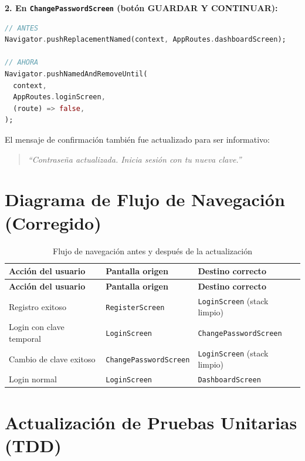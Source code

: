 \documentclass[12pt,a4paper]{article}
\begin{document}
\textbf{2. En \texttt{ChangePasswordScreen} (botón GUARDAR Y CONTINUAR):}
\begin{lstlisting}[language=Dart, caption={Redirección a login tras cambio exitoso}]
// ANTES
Navigator.pushReplacementNamed(context, AppRoutes.dashboardScreen);

// AHORA
Navigator.pushNamedAndRemoveUntil(
  context,
  AppRoutes.loginScreen,
  (route) => false,
);
\end{lstlisting}

El mensaje de confirmación también fue actualizado para ser informativo:
\begin{quote}
\textit{``Contraseña actualizada. Inicia sesión con tu nueva clave.''}
\end{quote}

\section{Diagrama de Flujo de Navegación (Corregido)}

\begin{longtable}{p{5cm} p{5cm} p{3.5cm}}
\caption{Flujo de navegación antes y después de la actualización} \label{tab:flujo-nav} \\
\toprule
\textbf{Acción del usuario} & \textbf{Pantalla origen} & \textbf{Destino correcto} \\
\midrule
\endfirsthead
\toprule
\textbf{Acción del usuario} & \textbf{Pantalla origen} & \textbf{Destino correcto} \\
\midrule
\endhead
\bottomrule
\endlastfoot
Registro exitoso & \texttt{RegisterScreen} & \texttt{LoginScreen} (stack limpio) \\
Login con clave temporal & \texttt{LoginScreen} & \texttt{ChangePasswordScreen} \\
Cambio de clave exitoso & \texttt{ChangePasswordScreen} & \texttt{LoginScreen} (stack limpio) \\
Login normal & \texttt{LoginScreen} & \texttt{DashboardScreen} \\
\end{longtable}

\section{Actualización de Pruebas Unitarias (TDD)}
\end{document}
